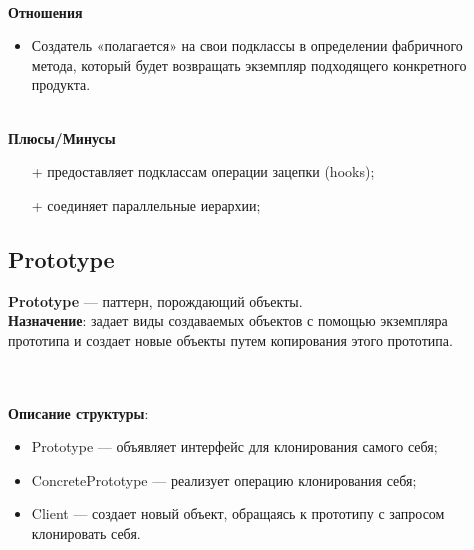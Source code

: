 \documentclass[a3paper,11pt]{report}
\def \boxSize {7cm}
\def \sboxSize {5cm}
\renewcommand{\unidirectionalAssociation}[4]{
	\draw [umlcd style, ->, umlcdNS] (#1) -- (#4)
	node[near end, above]{#2}
	node[near end, below]{#3};
}
\newcommand{\umlnoteND}[6]{
	\node[umlcd style, anchor=north, draw, shape=umlcdnote, text width=#2] at (#1) (note) {#3};
	\draw [umlcd style dashed line , ] (note.#4) ++(#5) --++(#6) coordinate(tmp) node[circle,inner sep=0pt,draw, fill=black!1, minimum size=5pt] (NoD) { };
}
\begin{document}
\textbf{\\Отношения}
\begin{itemize}
\item Создатель «полагается» на свои подклассы в определении фабричного метода, который будет возвращать экземпляр подходящего конкретного продукта.
\end{itemize}

\textbf{\\Плюсы/Минусы}
\begin{itemize}
\item [+] предоставляет подклассам операции зацепки (hooks);
\item [+] соединяет параллельные иерархии;
\end{itemize}

\newpage
\subsection{Prototype}

\large\textbf{Prototype} --- паттерн, порождающий объекты.
\\
\large\textbf{Назначение}: задает виды создаваемых объектов с помощью экземпляра прототипа и создает новые объекты путем копирования этого прототипа. 
\\

\\\\
\textbf{Описание структуры}:
\begin{itemize}
\item Prototype --- объявляет интерфейс для клонирования самого себя;
\item ConcretePrototype --- реализует операцию клонирования себя;
\item Client --- создает новый объект, обращаясь к прототипу с запросом клонировать себя.
\end{itemize}
\end{document}
